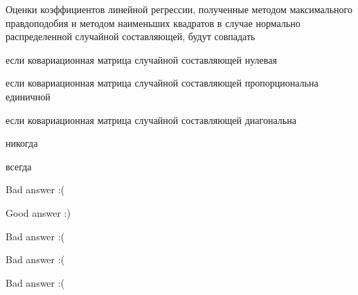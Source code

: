 
\begin{question}
Оценки коэффициентов линейной регрессии, полученные методом максимального правдоподобия и методом наименьших квадратов в случае нормально распределенной случайной составляющей, будут совпадать
\begin{answerlist}
  \item если ковариационная матрица случайной составляющей нулевая
  \item если ковариационная матрица случайной составляющей пропорциональна единичной
  \item если ковариационная матрица случайной составляющей диагональна
  \item никогда
  \item всегда
\end{answerlist}
\end{question}

\begin{solution}
\begin{answerlist}
  \item Bad answer :(
  \item Good answer :)
  \item Bad answer :(
  \item Bad answer :(
  \item Bad answer :(
\end{answerlist}
\end{solution}

